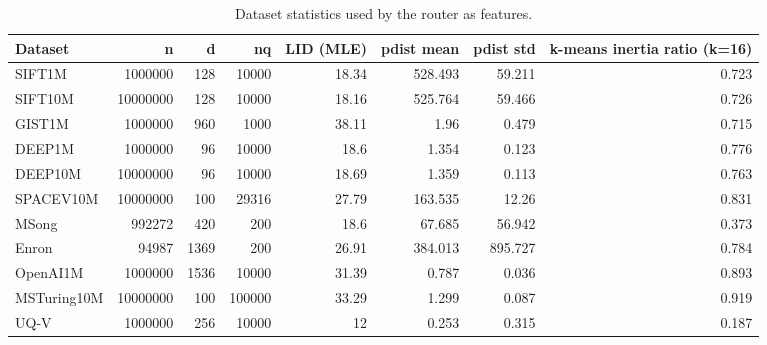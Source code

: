 \begin{table}[t]
\centering
\small
\caption{Dataset statistics used by the router as features.}
\label{tab:dataset-features}
\begin{tabular}{lrrrrrrr}
\toprule
Dataset & n & d & nq & LID (MLE) & pdist mean & pdist std & k-means inertia ratio (k=16) \\
\midrule
SIFT1M & 1000000 & 128 & 10000 & 18.34 & 528.493 & 59.211 & 0.723 \\
SIFT10M & 10000000 & 128 & 10000 & 18.16 & 525.764 & 59.466 & 0.726 \\
GIST1M & 1000000 & 960 & 1000 & 38.11 & 1.96 & 0.479 & 0.715 \\
DEEP1M & 1000000 & 96 & 10000 & 18.6 & 1.354 & 0.123 & 0.776 \\
DEEP10M & 10000000 & 96 & 10000 & 18.69 & 1.359 & 0.113 & 0.763 \\
SPACEV10M & 10000000 & 100 & 29316 & 27.79 & 163.535 & 12.26 & 0.831 \\
MSong & 992272 & 420 & 200 & 18.6 & 67.685 & 56.942 & 0.373 \\
Enron & 94987 & 1369 & 200 & 26.91 & 384.013 & 895.727 & 0.784 \\
OpenAI1M & 1000000 & 1536 & 10000 & 31.39 & 0.787 & 0.036 & 0.893 \\
MSTuring10M & 10000000 & 100 & 100000 & 33.29 & 1.299 & 0.087 & 0.919 \\
UQ-V & 1000000 & 256 & 10000 & 12 & 0.253 & 0.315 & 0.187 \\
\bottomrule
\end{tabular}
\end{table}
